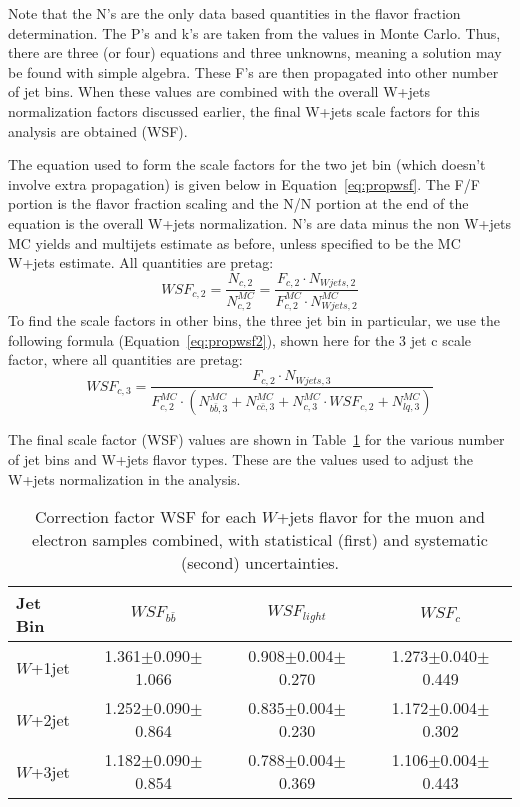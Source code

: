Note that the N's are the only data based quantities in the flavor fraction determination.  The P's and k's are taken from the values in Monte Carlo.  Thus, there are three (or four) equations and three unknowns, meaning a solution may be found with simple algebra.  These F's are then propagated into other number of jet bins.  When these values are combined with the overall W+jets normalization factors discussed earlier, the final W+jets scale factors for this analysis are obtained (WSF).

The equation used to form the scale factors for the two jet bin (which doesn't involve extra propagation) is given below in Equation~\ref{eq:propwsf}.  The F/F portion is the flavor fraction scaling and the N/N portion at the end of the equation is the overall W+jets normalization.  N's are data minus the non W+jets MC yields and multijets estimate as before, unless specified to be the MC W+jets estimate.  All quantities are pretag:
\begin{equation}\label{eq:propwsf}
 WSF_{c, 2} = \frac{N_{c, 2}}{N_{c, 2}^{MC}} =  \frac{F_{c, 2} \cdot N_{Wjets, 2}}{F^{MC}_{c, 2} \cdot N_{Wjets, 2}^{MC}}
\end{equation}
To find the scale factors in other bins, the three jet bin in particular, we use the following formula (Equation~\ref{eq:propwsf2}), shown here for the 3 jet c scale factor, where all quantities are pretag:
\begin{equation}\label{eq:propwsf2}
 WSF_{c, 3} = \frac{F_{c, 2} \cdot N_{Wjets, 3}}{F^{MC}_{c, 2} \cdot (N_{b\bar{b}, 3}^{MC} +N_{c\bar{c}, 3}^{MC} +N_{c, 3}^{MC}\cdot WSF_{c, 2}  +N_{lq, 3}^{MC} )}
\end{equation}

The final scale factor (WSF) values are shown in Table~\ref{tab:KFactor_comb_final} for the various number of jet bins and W+jets flavor types.  These are the values used to adjust the W+jets normalization in the analysis.

\begin{table}[!h!tpb]
  \begin{center}
    \begin{tabular}{lccc}
      \hline \hline
        Jet Bin &   $WSF_{b\bar{b}}$ &  $WSF_{light}$    &  $WSF_{c}$ \\\hline
        $W$+1jet   &1.361$\pm$0.090$\pm$1.066  &0.908$\pm$0.004$\pm$0.270& 1.273$\pm$0.040$\pm$0.449\\
        $W$+2jet   &1.252$\pm$0.090$\pm$0.864  &0.835$\pm$0.004$\pm$0.230& 1.172$\pm$0.004$\pm$0.302\\
        $W$+3jet   &1.182$\pm$0.090$\pm$0.854  &0.788$\pm$0.004$\pm$0.369& 1.106$\pm$0.004$\pm$0.443\\
      \hline
      \hline
    \end{tabular}
  \caption{Correction factor WSF for each $W$+jets flavor for the muon and electron samples combined, with statistical (first) and systematic (second) uncertainties.
  \label{tab:KFactor_comb_final} }
  \end{center}
\end{table}
